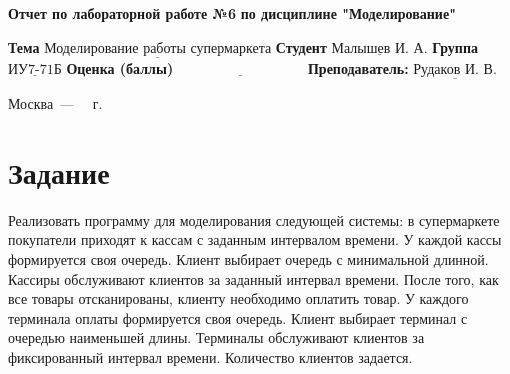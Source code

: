 \documentclass[14pt]{extreport}
\begin{document}
\begin{titlepage}
		
		\begin{center}
			\noindent\begin{minipage}{1.3\textwidth}\centering
				\Large\textbf{  Отчет по лабораторной работе №6}\newline
				\textbf{по дисциплине \newline "Моделирование"}\newline\newline
			\end{minipage}
		\end{center}
		
		\noindent\textbf{Тема} $\underline{\text{Моделирование работы супермаркета}}$\newline\newline
		\noindent\textbf{Студент} $\underline{\text{Малышев И. А.}}$\newline\newline
		\noindent\textbf{Группа} $\underline{\text{ИУ7-71Б}}$\newline\newline
		\noindent\textbf{Оценка (баллы)} $\underline{\text{~~~~~~~~~~~~~~~~~~~~~~~~~~~}}$\newline\newline
		\noindent\textbf{Преподаватель: } $\underline{\text{Рудаков И. В.}}$\newline\newline\newline
		
		\begin{center}
			\vfill
			Москва~---~\the\year
			~г.
		\end{center}
	\end{titlepage}
	
	
	\setcounter{page}{2}

\chapter{Задание}

Реализовать программу для моделирования следующей системы: в супермаркете покупатели приходят к кассам с заданным интервалом времени. У каждой кассы формируется своя очередь. Клиент выбирает очередь с минимальной длинной. Кассиры обслуживают клиентов за заданный интервал времени. После того, как все товары отсканированы, клиенту необходимо оплатить товар. У каждого терминала оплаты формируется своя очередь. Клиент выбирает терминал с очередью наименьшей длины. Терминалы обслуживают клиентов за фиксированный интервал времени. Количество клиентов задается. 
\end{document}
